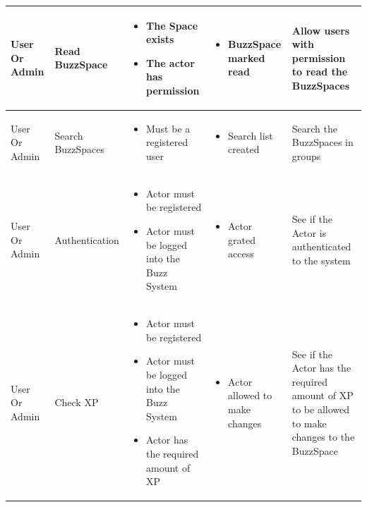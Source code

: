 \documentclass{article}
\begin{document}
\begin{longtable}{@{}|p{1.5cm}|p{2.2cm}|p{3cm}|p{3.5cm}|p{3.5cm}|@{}}
		User Or Admin& 
		Read BuzzSpace& 
		\begin{itemize}
			\item The Space exists
			\item The actor has permission
		\end{itemize}& 
		\begin{itemize}
			\item BuzzSpace marked read
		\end{itemize} & 
		Allow users with permission to read the BuzzSpaces \\ \midrule
		
		User Or Admin& 
		Search BuzzSpaces& 
		\begin{itemize}
			\item Must be a registered user
		\end{itemize}& 
		\begin{itemize}
			\item Search list created
		\end{itemize} & 
		Search the BuzzSpaces in groups \\ \midrule
		
		User Or Admin& 
		Authentication& 
		\begin{itemize}
			\item Actor must be registered
			\item Actor must be logged into the Buzz System 
		\end{itemize}& 
		\begin{itemize}
			\item Actor grated access
		\end{itemize} & 
		See if the Actor is authenticated to the system \\ \midrule
		
		User Or Admin& 
		Check XP& 
		\begin{itemize}
			\item Actor must be registered
			\item Actor must be logged into the Buzz System 
			\item Actor has the required amount of XP
		\end{itemize}& 
		\begin{itemize}
			\item Actor allowed to make changes
		\end{itemize} & 
		See if the Actor has the required amount of XP to be allowed to make changes to the BuzzSpace \\ \bottomrule
		
	\end{longtable}

	
\end{document}
